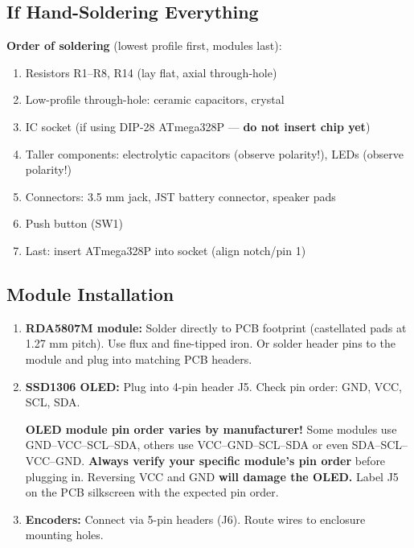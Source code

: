 \documentclass[a4paper,11pt]{article}
\renewcommand*{\,}{ }%
\begin{document}
\subsection{If Hand-Soldering Everything}

\textbf{Order of soldering} (lowest profile first, modules last):

\begin{enumerate}
    \item Resistors R1--R8, R14 (lay flat, axial through-hole)
    \item Low-profile through-hole: ceramic capacitors, crystal
    \item IC socket (if using DIP-28 ATmega328P --- \textbf{do not insert chip yet})
    \item Taller components: electrolytic capacitors (observe polarity!), LEDs (observe polarity!)
    \item Connectors: 3.5\,mm jack, JST battery connector, speaker pads
    \item Push button (SW1)
    \item Last: insert ATmega328P into socket (align notch/pin 1)
\end{enumerate}

\subsection{Module Installation}

\begin{enumerate}
    \item \textbf{RDA5807M module:} Solder directly to PCB footprint (castellated pads at 1.27\,mm pitch). Use flux and fine-tipped iron. Or solder header pins to the module and plug into matching PCB headers.
    \item \textbf{SSD1306 OLED:} Plug into 4-pin header J5. Check pin order: GND, VCC, SCL, SDA.
    
    \begin{warningbox}
    \textbf{OLED module pin order varies by manufacturer!} Some modules use GND--VCC--SCL--SDA, others use VCC--GND--SCL--SDA or even SDA--SCL--VCC--GND. \textbf{Always verify your specific module's pin order} before plugging in. Reversing VCC and GND \textbf{will damage the OLED.} Label J5 on the PCB silkscreen with the expected pin order.
    \end{warningbox}
    \item \textbf{Encoders:} Connect via 5-pin headers (J6). Route wires to enclosure mounting holes.
\end{enumerate}
\end{document}
